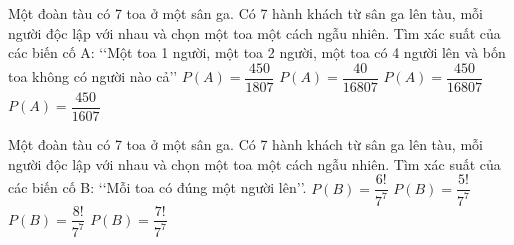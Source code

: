 \begin{ex}
Một đoàn tàu có 7 toa ở một sân ga. Có 7 hành khách từ sân ga lên tàu, mỗi người độc lập với nhau và chọn một toa một cách ngẫu nhiên. Tìm xác suất của các biến cố A: \lq\lq  Một toa 1 người, một toa 2 người, một toa có 4 người lên và bốn toa không có người nào cả\rq\rq 
\choice
{$P(A)=\dfrac{450}{1807}$}
{$P(A)=\dfrac{40}{16807}$ }
{\True $P(A)=\dfrac{450}{16807}$}
{$P(A)=\dfrac{450}{1607}$}
\end{ex}
\begin{ex}
Một đoàn tàu có 7 toa ở một sân ga. Có 7 hành khách từ sân ga lên tàu, mỗi người độc lập với nhau và chọn một toa một cách ngẫu nhiên. Tìm xác suất của các biến cố B: \lq\lq  Mỗi toa có đúng một người lên\rq\rq .
\choice
{$P(B)=\dfrac{6!}{7^7}$}
{$P(B)=\dfrac{5!}{7^7}$}
{$P(B)=\dfrac{8!}{7^7}$}
{\True $P(B)=\dfrac{7!}{7^7}$}
\end{ex}
